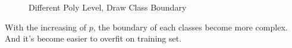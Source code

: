 \documentclass[12pt]{article}
\begin{document}
\begin{enumerate}
    \begin{figure}[H]
        \centering
        \caption{Different Poly Level, Draw Class Boundary}
        \label{Fig.lable}
    \end{figure}

    With the increasing of $p$, the boundary of each classes become more complex. And it's become easier to overfit on training set.

\end{enumerate}
\end{document}

